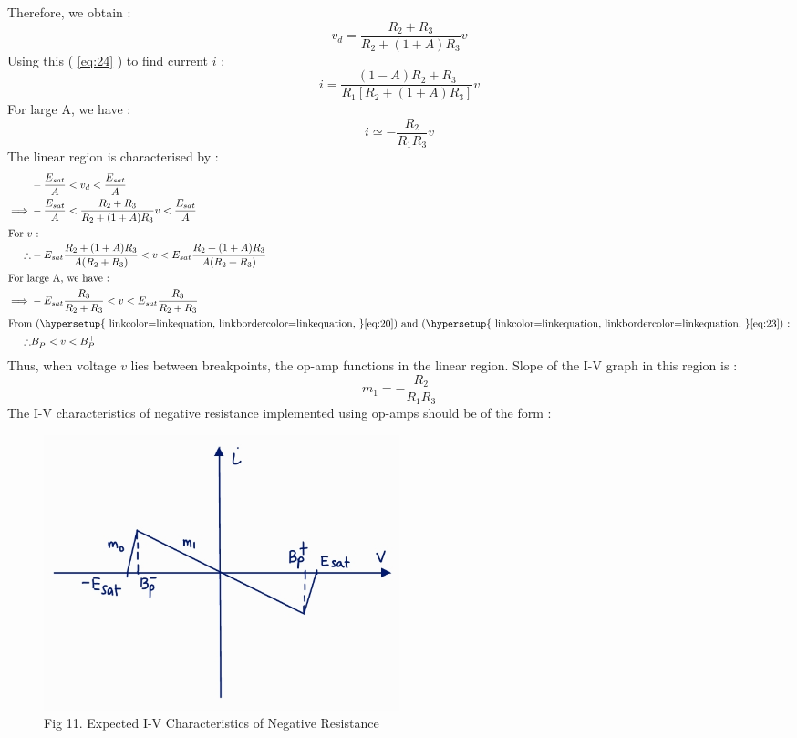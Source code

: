 \documentclass[12pt]{article}
\newcommand*{\myref}[1]{%
  \begingroup
    \hypersetup{
      linkcolor=linkequation,
      linkbordercolor=linkequation,
    }%
    \ref{#1}%
  \endgroup
}
\begin{document}
Therefore, we obtain :
\begin{equation}
	v_d= \dfrac{R_2+R_3}{R_2+(1+A)R_3}v \label{eq:24}
\end{equation}
Using this (\myref{eq:24}) to find current $i$ :
\begin{equation}
	i = \dfrac{(1-A)R_2+R_3}{R_1\left[ R_2+(1+A)R_3 \right]}v \label{eq:25}
\end{equation}
For large A, we have :
\begin{equation}
	i \simeq - \dfrac{R_2}{R_1R_3}v \label{eq:26}
\end{equation}
The linear region is characterised by :
\begin{align*}
	& -\dfrac{E_{sat}}{A}<v_d<\dfrac{E_{sat}}{A} \\
	\implies & -\dfrac{E_{sat}}{A}<\dfrac{R_2+R_3}{R_2+(1+A)R_3}v < \dfrac{E_{sat}}{A} \\
	\intertext{For $v$ : }
	\therefore & -E_{sat}\dfrac{R_2+(1+A)R_3}{A(R_2+R_3)} < v < E_{sat} \dfrac{R_2+(1+A)R_3}{A(R_2+R_3)} \\
	\intertext{For large A, we have :}
	\implies & -E_{sat}\dfrac{R_3}{R_2+R_3}<v<E_{sat}\dfrac{R_3}{R_2+R_3} \\
	\intertext{From (\myref{eq:20}) and (\myref{eq:23}) :}
	\therefore & B^-_P < v < B^+_P 
\end{align*}
Thus, when voltage $v$ lies between breakpoints, the op-amp functions in the linear region. \linebreak
Slope of the I-V graph in this region is :
\begin{equation}
	m_1=-\dfrac{R_2}{R_1R_3} \label{eq:27}
\end{equation}
The I-V characteristics of negative resistance implemented using op-amps should be of the form :
\begin{figure}[H]
	\centering
	\includegraphics[width=0.5\textwidth]{Images/fig11_negative characteristics.png}
	\caption{Fig 11. Expected I-V Characteristics of Negative Resistance}
\end{figure}
\end{document}
